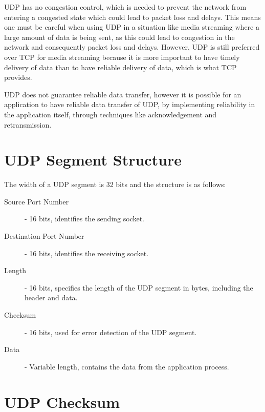 \documentclass[12pt letter]{report}
\begin{document}
UDP has no congestion control, which is needed to prevent the network
from entering a congested state which could lead to packet loss and
delays. This means one must be careful when using UDP in a situation
like media streaming where a large amount of data is being sent, as
this could lead to congestion in the network and consequently packet
loss and delays. However, UDP is still preferred over TCP for media
streaming because it is more important to have timely delivery of
data than to have reliable delivery of data, which is what TCP provides.

UDP does not guarantee reliable data transfer, however it is possible
for an application to have reliable data transfer of UDP, by
implementing reliability in the application itself, through
techniques like acknowledgement and retransmission.

\section{UDP Segment Structure}
The width of a UDP segment is 32 bits and the structure is as follows:
\begin{description}
  \item[Source Port Number]  - 16 bits, identifies the sending socket.
  \item[Destination Port Number] - 16 bits, identifies the receiving socket.
  \item[Length] - 16 bits, specifies the length of the UDP segment in bytes,
    including the header and data.
  \item[Checksum] - 16 bits, used for error detection of the UDP segment.
  \item [Data] - Variable length, contains the data from the
    application process.
\end{description}

\section{UDP Checksum}
\end{document}
